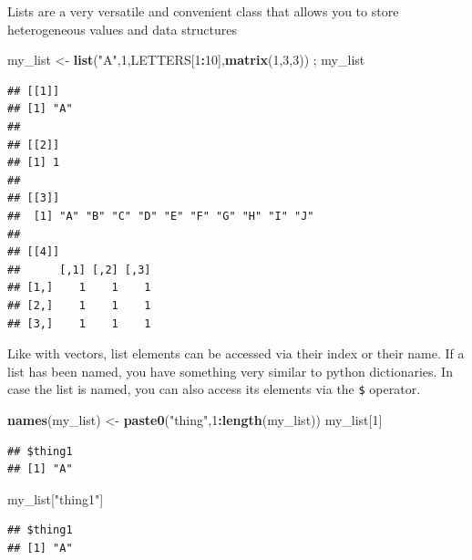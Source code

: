 \documentclass[
]{book}
\newenvironment{Shaded}{\begin{snugshade}}{\end{snugshade}}
\newcommand{\DecValTok}[1]{\textcolor[rgb]{0.00,0.00,0.81}{#1}}
\newcommand{\KeywordTok}[1]{\textcolor[rgb]{0.13,0.29,0.53}{\textbf{#1}}}
\newcommand{\NormalTok}[1]{#1}
\newcommand{\OperatorTok}[1]{\textcolor[rgb]{0.81,0.36,0.00}{\textbf{#1}}}
\newcommand{\StringTok}[1]{\textcolor[rgb]{0.31,0.60,0.02}{#1}}
\begin{document}
Lists are a very versatile and convenient class that allows you to store heterogeneous values and data structures

\begin{Shaded}
\begin{Highlighting}[]
\NormalTok{my_list <-}\StringTok{ }\KeywordTok{list}\NormalTok{(}\StringTok{"A"}\NormalTok{,}\DecValTok{1}\NormalTok{,LETTERS[}\DecValTok{1}\OperatorTok{:}\DecValTok{10}\NormalTok{],}\KeywordTok{matrix}\NormalTok{(}\DecValTok{1}\NormalTok{,}\DecValTok{3}\NormalTok{,}\DecValTok{3}\NormalTok{)) ; my_list}
\end{Highlighting}
\end{Shaded}

\begin{verbatim}
## [[1]]
## [1] "A"
## 
## [[2]]
## [1] 1
## 
## [[3]]
##  [1] "A" "B" "C" "D" "E" "F" "G" "H" "I" "J"
## 
## [[4]]
##      [,1] [,2] [,3]
## [1,]    1    1    1
## [2,]    1    1    1
## [3,]    1    1    1
\end{verbatim}

Like with vectors, list elements can be accessed via their index or their name. If a list has been named, you have something very similar to python dictionaries. In case the list is named, you can also access its elements via the \texttt{\$} operator.

\begin{Shaded}
\begin{Highlighting}[]
\KeywordTok{names}\NormalTok{(my_list) <-}\StringTok{ }\KeywordTok{paste0}\NormalTok{(}\StringTok{"thing"}\NormalTok{,}\DecValTok{1}\OperatorTok{:}\KeywordTok{length}\NormalTok{(my_list))}
\NormalTok{my_list[}\DecValTok{1}\NormalTok{]}
\end{Highlighting}
\end{Shaded}

\begin{verbatim}
## $thing1
## [1] "A"
\end{verbatim}

\begin{Shaded}
\begin{Highlighting}[]
\NormalTok{my_list[}\StringTok{"thing1"}\NormalTok{]}
\end{Highlighting}
\end{Shaded}

\begin{verbatim}
## $thing1
## [1] "A"
\end{verbatim}

\begin{Shaded}
\end{Shaded}
\end{document}
